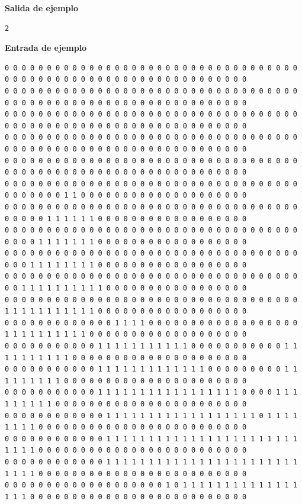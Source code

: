 \documentclass{oci}
\begin{document}
\begin{sampleDescription}
{\bf Salida de ejemplo}
\begin{verbatim}
2
\end{verbatim}
\newpage

{\bf Entrada de ejemplo}
{\tiny
\begin{verbatim}
0 0 0 0 0 0 0 0 0 0 0 0 0 0 0 0 0 0 0 0 0 0 0 0 0 0 0 0 0 0 0 0 0 0 0 0 0 0 0 0 0 0 0 0 0 0 0 0 0 0 0 0 0 0 0 0 0 0 0 0 0 0 0 0
0 0 0 0 0 0 0 0 0 0 0 0 0 0 0 0 0 0 0 0 0 0 0 0 0 0 0 0 0 0 0 0 0 0 0 0 0 0 0 0 0 0 0 0 0 0 0 0 0 0 0 0 0 0 0 0 0 0 0 0 0 0 0 0
0 0 0 0 0 0 0 0 0 0 0 0 0 0 0 0 0 0 0 0 0 0 0 0 0 0 0 0 0 0 0 0 0 0 0 0 0 0 0 0 0 0 0 0 0 0 0 0 0 0 0 0 0 0 0 0 0 0 0 0 0 0 0 0
0 0 0 0 0 0 0 0 0 0 0 0 0 0 0 0 0 0 0 0 0 0 0 0 0 0 0 0 0 0 0 0 0 0 0 0 0 0 0 0 0 0 0 0 0 0 0 0 0 0 0 0 0 0 0 0 0 0 0 0 0 0 0 0
0 0 0 0 0 0 0 0 0 0 0 0 0 0 0 0 0 0 0 0 0 0 0 0 0 0 0 0 0 0 0 0 0 0 0 0 0 0 0 0 0 0 0 0 0 0 0 0 0 0 0 0 0 0 0 0 0 0 0 0 0 0 0 0
0 0 0 0 0 0 0 0 0 0 0 0 0 0 0 0 0 0 0 0 0 0 0 0 0 0 0 0 0 0 0 0 0 0 0 0 0 0 0 0 0 0 1 1 0 0 0 0 0 0 0 0 0 0 0 0 0 0 0 0 0 0 0 0
0 0 0 0 0 0 0 0 0 0 0 0 0 0 0 0 0 0 0 0 0 0 0 0 0 0 0 0 0 0 0 0 0 0 0 0 0 0 0 0 1 1 1 1 1 1 0 0 0 0 0 0 0 0 0 0 0 0 0 0 0 0 0 0
0 0 0 0 0 0 0 0 0 0 0 0 0 0 0 0 0 0 0 0 0 0 0 0 0 0 0 0 0 0 0 0 0 0 0 0 0 0 0 1 1 1 1 1 1 1 0 0 0 0 0 0 0 0 0 0 0 0 0 0 0 0 0 0
0 0 0 0 0 0 0 0 0 0 0 0 0 0 0 0 0 0 0 0 0 0 0 0 0 0 0 0 0 0 0 0 0 0 0 0 0 0 1 1 1 1 1 1 1 1 0 0 0 0 0 0 0 0 0 0 0 0 0 0 0 0 0 0
0 0 0 0 0 0 0 0 0 0 0 0 0 0 0 0 0 0 0 0 0 0 0 0 0 0 0 0 0 0 0 0 0 0 0 0 0 1 1 1 1 1 1 1 1 1 1 0 0 0 0 0 0 0 0 0 0 0 0 0 0 0 0 0
0 0 0 0 0 0 0 0 0 0 0 0 0 0 0 0 0 0 0 0 0 0 0 0 0 0 0 0 0 0 0 0 0 0 0 1 1 1 1 1 1 1 1 1 1 1 0 0 0 0 0 0 0 0 0 0 0 0 0 0 0 0 0 0
0 0 0 0 0 0 0 0 0 0 0 0 0 1 1 1 1 0 0 0 0 0 0 0 0 0 0 0 0 0 0 0 0 0 0 1 1 1 1 1 1 1 1 1 1 0 0 0 0 0 0 0 0 0 0 0 0 0 0 0 0 0 0 0
0 0 0 0 0 0 0 0 0 0 0 1 1 1 1 1 1 1 1 1 1 1 0 0 0 0 0 0 0 0 0 0 0 1 1 1 1 1 1 1 1 1 1 0 0 0 0 0 0 0 0 0 0 0 0 0 0 0 0 0 0 0 0 0
0 0 0 0 0 0 0 0 0 0 0 1 1 1 1 1 1 1 1 1 1 1 1 1 0 0 0 0 0 0 0 0 0 1 1 1 1 1 1 1 1 1 0 0 0 0 0 0 0 0 0 0 0 0 0 0 0 0 0 0 0 0 0 0
0 0 0 0 0 0 0 0 0 0 0 1 1 1 1 1 1 1 1 1 1 1 1 1 1 1 1 1 0 0 0 0 1 1 1 1 1 1 1 1 1 0 0 0 0 0 0 0 0 0 0 0 0 0 0 0 0 0 0 0 0 0 0 0
0 0 0 0 0 0 0 0 0 0 0 0 1 1 1 1 1 1 1 1 1 1 1 1 1 1 1 1 1 1 0 1 1 1 1 1 1 1 1 0 0 0 0 0 0 0 0 0 0 0 0 0 0 0 0 0 0 0 0 0 0 0 0 0
0 0 0 0 0 0 0 0 0 0 0 0 1 1 1 1 1 1 1 1 1 1 1 1 1 1 1 1 1 1 1 1 1 1 1 1 1 1 1 0 0 0 0 0 0 0 0 0 0 0 0 0 0 0 0 0 0 0 0 0 0 0 0 0
0 0 0 0 0 0 0 0 0 0 0 0 1 1 1 1 1 1 1 1 1 1 1 1 1 1 1 1 1 1 1 1 1 1 1 1 1 1 1 0 0 0 0 0 0 0 0 0 0 0 0 0 0 0 0 0 0 0 0 0 0 0 0 0
0 0 0 0 0 0 0 0 0 0 0 0 0 0 0 0 0 0 0 1 0 1 1 1 1 1 1 1 1 1 1 1 1 1 1 1 1 1 0 0 0 0 0 0 0 0 0 0 0 0 0 0 0 0 0 0 0 0 0 0 0 0 0 0

\end{verbatim}}
\end{sampleDescription}
\end{document}
